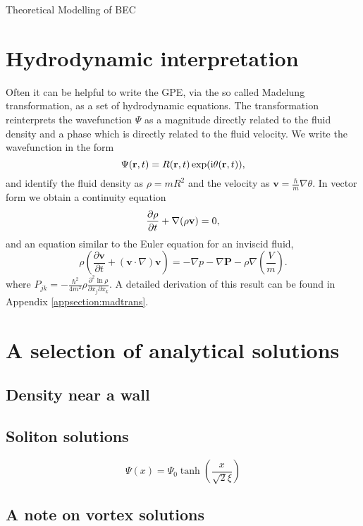 \begin{chapter}{\label{cha:theoretical_model}Theoretical Modelling of BEC}
\section{\label{section:hydrodynamic} Hydrodynamic interpretation}
	Often it can be helpful to write the GPE, via the so called Madelung transformation, as a set of hydrodynamic equations. The transformation reinterprets the wavefunction $\Psi$ as a magnitude directly related to the fluid density and a phase which is directly related to the fluid velocity. We write the wavefunction in the form
	\begin{equation}
		\Psi({\bf r},t) = R({\bf r},t)\exp (\mathrm{i}\theta({\bf r},t)),
	\end{equation}
	 and identify the fluid density as $\rho=mR^2$ and the velocity as $\mathbf{v} = \frac{\hbar}{m}\nabla\theta$.
	In vector form we obtain a continuity equation
	\begin{equation}
	  \frac{\partial \rho}{\partial t} + \nabla(\rho{\bf v}) = 0,
	  \label{eq:MTcont}
	\end{equation}
	and an equation similar to the Euler equation for an inviscid fluid,
	\begin{equation}
	\rho\left( \frac{\partial \mathbf{v}}{\partial t} + \left( \mathbf{v} \cdot \nabla \right)\mathbf{v} \right) = -\nabla p - \nabla \mathbf{P} - \rho \nabla \left(\frac{V}{m}\right).
	\end{equation}
	where $P_{jk} = -\frac{\hbar^2}{4m^2}\rho\frac{\partial^2\ln{\rho}}{\partial x_j \partial x_k}$.
	A detailed derivation of this result can be found in Appendix \ref{appsection:madtrans}.

\section{\label{section:solutions} A selection of analytical solutions}
	\subsection{\label{section:wall} Density near a wall}
	\subsection{\label{section:soliton} Soliton solutions}
		\begin{equation}
		\Psi(x) = \Psi_0 \tanh \left( \frac{x}{\sqrt{2}\xi} \right)
		\label{eq:soliton}
		\end{equation}
	\subsection{\label{section:vortices} A note on vortex solutions}

\end{chapter}
